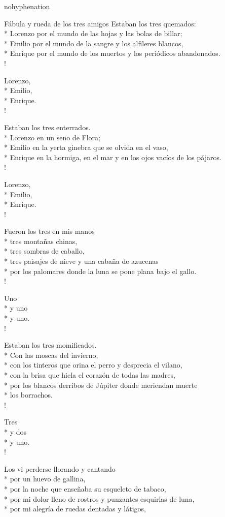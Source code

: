 \documentclass[
    a5paper,
    DIV=10,
    12pt,
    notitlepage,
    oneside,]
{scrbook} %
\begin{document}
\begin{hyphenrules}{nohyphenation}
\begin{poem}{Fábula y rueda de los tres amigos}{}{}
Estaban los tres quemados:\\*
Lorenzo por el mundo de las hojas y las bolas de billar;\\*
Emilio por el mundo de la sangre y los alfileres blancos,\\*
Enrique por el mundo de los muertos y los periódicos abandonados.\\!

Lorenzo,\\*
Emilio,\\*
Enrique.\\!

Estaban los tres enterrados.\\*
Lorenzo en un seno de Flora;\\*
Emilio en la yerta ginebra que se olvida en el vaso,\\*
Enrique en la hormiga, en el mar y en los ojos vacíos de los pájaros.\\!

Lorenzo,\\*
Emilio,\\*
Enrique.\\!

Fueron los tres en mis manos\\*
tres montañas chinas,\\*
tres sombras de caballo,\\*
tres paisajes de nieve y una cabaña de azucenas\\*
por los palomares donde la luna se pone plana bajo el gallo.\\!

Uno\\*
y uno\\*
y uno.\\!

Estaban los tres momificados.\\*
Con las moscas del invierno,\\*
con los tinteros que orina el perro y desprecia el vilano,\\*
con la brisa que hiela el corazón de todas las madres,\\*
por los blancos derribos de Júpiter donde meriendan muerte\\*
los borrachos.\\!

Tres\\*
y dos\\*
y uno.\\!

Los vi perderse llorando y cantando\\*
por un huevo de gallina,\\*
por la noche que enseñaba su esqueleto de tabaco,\\*
por mi dolor lleno de rostros y punzantes esquirlas de luna,\\*
por mi alegría de ruedas dentadas y látigos,\\


\end{poem}
\end{hyphenrules}
\end{document}
